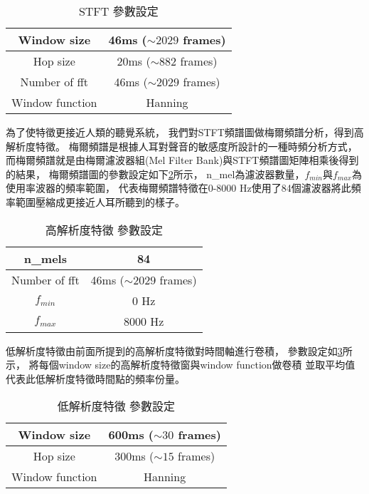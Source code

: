 \documentclass[class=NCU_thesis, crop=false]{standalone}
\begin{document}
\begin{table}[h]
    \centering
    \caption{STFT 參數設定}
    \label{table:table-stft-parameter-setting}
    \begin{tabular}{|c|c|}
        \hline
        \multicolumn{1}{|c|}{Window size} & \multicolumn{1}{|c|}{46ms ($\sim 2029$ frames)}\\
        \hline
        Hop size & 20ms ($\sim 882$ frames)\\
        \hline
        Number of fft & 46ms ($\sim 2029$ frames)\\
        \hline
        Window function & Hanning \\
        \hline
    \end{tabular}
\end{table}

為了使特徵更接近人類的聽覺系統，
我們對STFT頻譜圖做梅爾頻譜分析，得到高解析度特徵。
梅爾頻譜是根據人耳對聲音的敏感度所設計的一種時頻分析方式，
而梅爾頻譜就是由梅爾濾波器組(Mel Filter Bank)與STFT頻譜圖矩陣相乘後得到的結果，
梅爾頻譜圖的參數設定如下\cref{table:table-high-resolution-feature-parameter-setting}所示，
n\_mel為濾波器數量，$f_{min}$與$f_{max}$為使用率波器的頻率範圍，
代表梅爾頻譜特徵在0-8000 Hz使用了84個濾波器將此頻率範圍壓縮成更接近人耳所聽到的樣子。

\begin{table}[h]
    \centering
    \caption{高解析度特徵 參數設定}
    \label{table:table-high-resolution-feature-parameter-setting}
    \begin{tabular}{|c|c|}
        \hline
        \multicolumn{1}{|c|}{n\_mels} & \multicolumn{1}{|c|}{84}\\
        \hline
        Number of fft & 46ms ($\sim 2029$ frames)\\
        \hline
        $f_{min}$ & 0 Hz \\
        \hline
        $f_{max}$ & 8000 Hz \\
        \hline
    \end{tabular}
\end{table}

低解析度特徵由前面所提到的高解析度特徵對時間軸進行卷積，
參數設定如\cref{table:table-low-resolution-feature-parameter-setting}所示，
將每個window size的高解析度特徵窗與window function做卷積
並取平均值代表此低解析度特徵時間點的頻率份量。

\begin{table}[h]
    \centering
    \caption{低解析度特徵 參數設定}
    \label{table:table-low-resolution-feature-parameter-setting}
    \begin{tabular}{|c|c|}
        \hline
        \multicolumn{1}{|c|}{Window size} & \multicolumn{1}{|c|}{600ms ($\sim 30$ frames)}\\
        \hline
        Hop size & 300ms ($\sim 15$ frames)\\
        \hline
        Window function & Hanning \\
        \hline
    \end{tabular}
\end{table}
\end{document}
